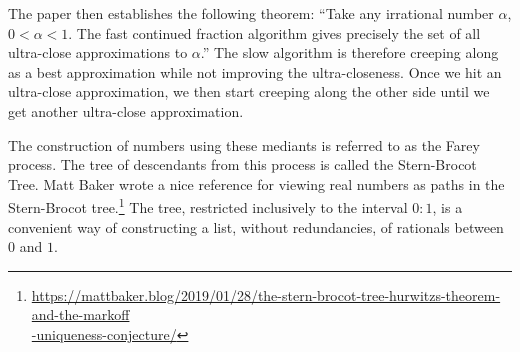 \documentclass[12pt]{article}
\begin{document}
The paper then establishes the following theorem: ``Take any irrational number $\alpha$, $0 < \alpha < 1$. The fast continued fraction algorithm gives precisely the set of all ultra-close approximations to $\alpha$.''  The slow algorithm is therefore creeping along as a best approximation while not improving the ultra-closeness. Once we hit an ultra-close approximation, we then start creeping along the other side until we get another ultra-close approximation. 

The construction of numbers using these mediants is referred to as the Farey process. The tree of descendants from this process is called the Stern-Brocot Tree. Matt Baker wrote a nice reference for viewing real numbers as paths in the Stern-Brocot tree.\footnote{{\href{https://mattbaker.blog/2019/01/28/the-stern-brocot-tree-hurwitzs-theorem-and-the-markoff-uniqueness-conjecture/}{https://mattbaker.blog/2019/01/28/the-stern-brocot-tree-hurwitzs-theorem-and-the-markoff} \\ \hspace*{10px}  \href{https://mattbaker.blog/2019/01/28/the-stern-brocot-tree-hurwitzs-theorem-and-the-markoff-uniqueness-conjecture/}{-uniqueness-conjecture/} }} The tree, restricted inclusively to the interval $0:1$, is a convenient way of constructing a list, without redundancies, of rationals between $0$ and $1$. 
\end{document}
